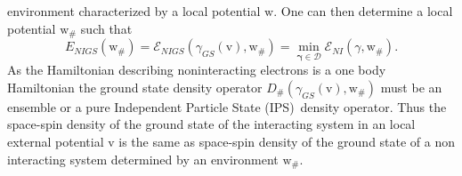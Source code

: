 \documentclass[aps,preprint]{revtex4}%
\begin{document}
environment characterized by a local potential $\mathrm{w.}$ One can then
determine a local potential $\mathrm{w}_{\#}$ such that
\begin{equation}
E_{NIGS}\left(  \mathrm{w}_{\#}\right)  =\mathcal{E}_{NIGS}\left(  \gamma
_{GS}\left(  \mathrm{v}\right)  \mathbf{,}\mathrm{w}_{\#}\right)
=\min_{\mathbf{\gamma\in}\mathcal{D}}\mathcal{E}_{NI}\left(  \gamma
\mathbf{,}\mathrm{w}_{\#}\right)  .
\end{equation}
As the Hamiltonian describing noninteracting electrons is a one body
Hamiltonian the ground state density operator $D_{\#}\left(  \gamma
_{GS}\left(  \mathrm{v}\right)  \mathbf{,}\mathrm{w}_{\#}\right)  $ must be an
ensemble or a pure Independent Particle State (IPS)\ density operator. Thus
the space-spin density of the ground state of the interacting system in an
local external potential $\mathrm{v}$ is the same as space-spin density of the
ground state of a non interacting system determined by an environment
$\mathrm{w}_{\#}\mathrm{.}$
\end{document}
